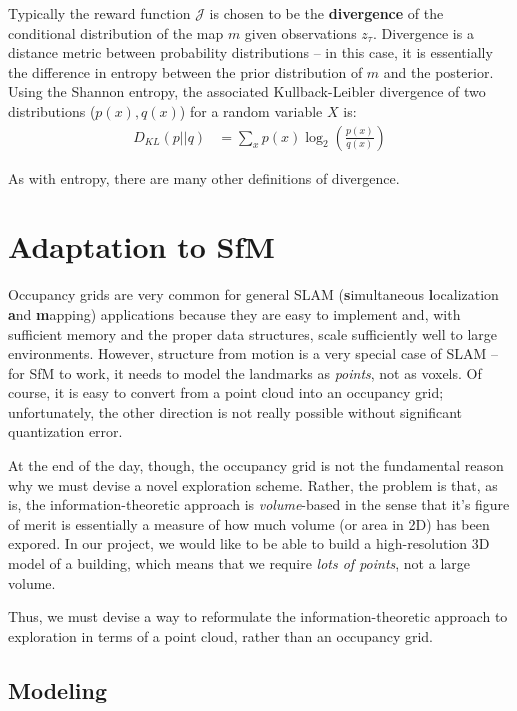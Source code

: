 \documentclass[12pt]{article}
\begin{document}
Typically the reward function $\mathcal{J}$ is chosen to be the \textbf{divergence} of the conditional distribution of the map $m$ given observations $z_{\tau}$. Divergence is a distance metric between probability distributions -- in this case, it is essentially the difference in entropy between the prior distribution of $m$ and the posterior. Using the Shannon entropy, the associated Kullback-Leibler divergence of two distributions ($p(x), q(x)$) for a random variable $X$ is:
\begin{align}
  D_{KL}(p || q) &= \sum_x p(x) \log_2 \left(\frac{p(x)}{q(x)}\right)
\end{align}

As with entropy, there are many other definitions of divergence.

\section{Adaptation to SfM}

Occupancy grids are very common for general SLAM (\textbf{s}imultaneous \textbf{l}ocalization \textbf{a}nd \textbf{m}apping) applications because they are easy to implement and, with sufficient memory and the proper data structures, scale sufficiently well to large environments. However, structure from motion is a very special case of SLAM -- for SfM to work, it needs to model the landmarks as \textit{points}, not as voxels. Of course, it is easy to convert from a point cloud into an occupancy grid; unfortunately, the other direction is not really possible without significant quantization error.

At the end of the day, though, the occupancy grid is not the fundamental reason why we must devise a novel exploration scheme. Rather, the problem is that, as is, the information-theoretic approach is \textit{volume}-based in the sense that it's figure of merit is essentially a measure of how much volume (or area in 2D) has been expored. In our project, we would like to be able to build a high-resolution 3D model of a building, which means that we require \textit{lots of points}, not a large volume.

Thus, we must devise a way to reformulate the information-theoretic approach to exploration in terms of a point cloud, rather than an occupancy grid.

\subsection{Modeling}
\end{document}
